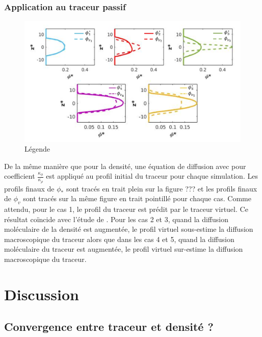\documentclass[a4paper,12pt]{article}
\begin{document}
    \subsubsection{Application au traceur passif}
    \begin{figure}[!h]
        \centering
        \label{scatterplot_phi}
        \includegraphics[width=1\linewidth]{figures/profils_Krho.png}
        \caption{Légende}
    \end{figure}
    
    De la même manière que pour la densité, une équation de diffusion avec pour coefficient $\frac{\kappa_{\phi}}{\kappa_{\rho}}$ est appliqué au profil initial du traceur pour chaque simulation. Les profils finaux de $\phi_*$ sont tracés en trait plein sur la figure ??? et les profils finaux de $\phi_v$ sont tracés sur la même figure en trait pointillé pour chaque cas. Comme attendu, pour le cas 1, le profil du traceur est prédit par le traceur virtuel. Ce résultat coïncide avec l'étude de \cite{penney_diapycnal_2020}. Pour les cas 2 et 3, quand la diffusion moléculaire de la densité est augmentée, le profil virtuel sous-estime la diffusion macroscopique du traceur alors que dans les cas 4 et 5, quand la diffusion moléculaire du traceur est augmentée, le profil virtuel sur-estime la diffusion macroscopique du traceur. 

\newpage
\section{Discussion}

    \subsection{Convergence entre traceur et densité ?}
    
\end{document}
